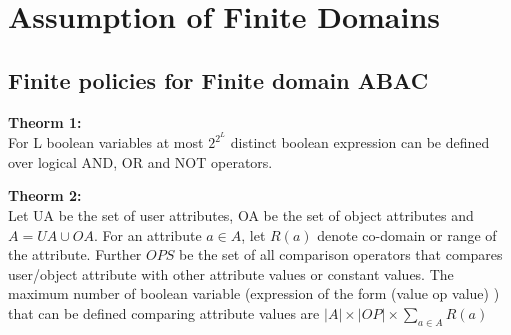 \section{Assumption of Finite Domains}
\subsection{Finite policies for Finite domain ABAC}

\textbf{Theorm 1:} \\
For L boolean variables at most $2^{2^L}$ distinct boolean expression can be defined over logical AND, OR and NOT operators. 

\textbf{Theorm 2:} \\
Let UA be the set of user attributes, OA be the set of object attributes and $A=UA \cup OA$. For an attribute $a \in A$, let $R(a)$ denote co-domain or range of the attribute. Further $OPS$ be the set of all comparison operators that compares user/object attribute with other attribute values or constant values. The maximum number of boolean variable (expression of the form (value op value) ) that can be defined comparing attribute values are $|A| \times |OP| \times \sum_{a \in A} R(a)$